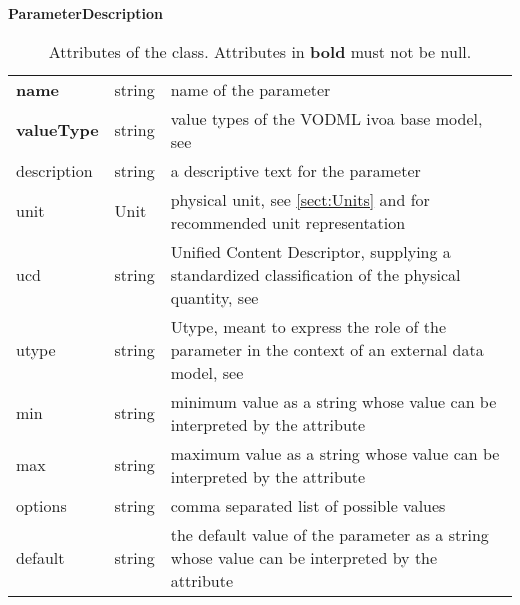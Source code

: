 \begin{table}[ht]
\small
{}\textwidth
\textbf{\normalsize ParameterDescription}\vspace{0.25em}\\
\begin{tabulary}{1.0\textwidth}{lLL}
 \toprule
  &    & \\
 \midrule
\textbf{name} & string & name of the parameter \\
\textbf{valueType} & string & value types of the VODML ivoa base model, see \citet{2018ivoa.spec.0910L} \\
description & string  & a descriptive text for the parameter \\
unit        & Unit  & physical unit, see \ref{sect:Units} and \citet{2014ivoa.spec.0523D} for recommended unit representation \\
ucd         & string  & Unified Content Descriptor, supplying a standardized classification of the physical quantity, see \citet{2018ivoa.spec.0527M} \\
utype       & string  & Utype, meant to express the role of the parameter in the context of an external data model, see \citet{note:utypeusage} \\
min         & string & minimum value as a string whose value can be interpreted by the  attribute \\
max         & string & maximum value as a string whose value can be interpreted by the  attribute\\
options     & string & comma separated list of possible values\\
default     & string & the default value of the parameter as a string whose value can be interpreted by the  attribute \\
\bottomrule
\end{tabulary}
\caption[Attributes of the  class]{Attributes of the   class. Attributes in \textbf{bold} must not be null.}
\label{tab:Paramdescription}
\end{table}


